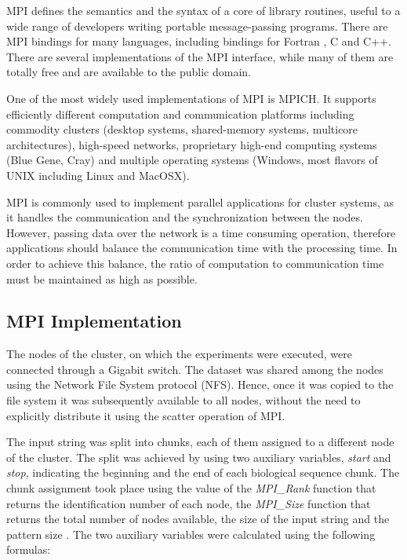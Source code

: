 \documentclass{ws-ijait}
\begin{document}
MPI defines the semantics and the syntax of a core of library routines, useful to a wide range of developers writing portable message-passing programs. There are MPI bindings for many languages, including bindings for Fortran , C and C++. There are several implementations of the MPI interface, while many of them are totally free and are available to the public domain.

One of the most widely used implementations of MPI is MPICH.\cite{mpich} It supports efficiently different computation and communication platforms including commodity clusters (desktop systems, shared-memory systems, multicore architectures), high-speed networks, proprietary high-end computing systems (Blue Gene, Cray) and multiple operating systems (Windows, most flavors of UNIX including Linux and MacOSX).

MPI is commonly used to implement parallel applications for cluster systems, as it handles the communication and the synchronization between the nodes. However, passing data over the network is a time consuming operation, therefore applications should balance the communication time with the processing time. In order to achieve this balance, the ratio of computation to communication time must be maintained as high as possible.

\subsection{MPI Implementation}
The nodes of the cluster, on which the experiments were executed, were connected through a Gigabit switch. The dataset was shared among the nodes using the Network File System\cite{Callaghan2000} protocol (NFS). Hence, once it was copied to the file system it was subsequently available to all nodes, without the need to explicitly distribute it using the scatter operation of MPI.

The input string was split into chunks, each of them assigned to a different node of the cluster. The split was achieved by using two auxiliary variables, \textit{start} and \textit{stop}, indicating the beginning and the end of each biological sequence chunk. The chunk assignment took place using the value of the \textit{MPI\_Rank} function that returns the identification number of each node, the \textit{MPI\_Size} function that returns the total number of nodes available, the size  of the input string and the pattern size . The two auxiliary variables were calculated using the following formulas:
\end{document}
